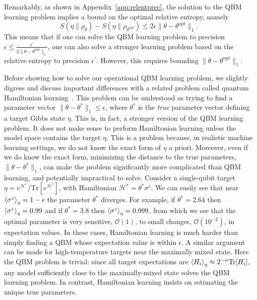 \documentclass[
    aps,
    prx,
    floatfix,
    nofootinbib,
    onecolumn
]{revtex4-2}
\newcommand{\Tr}{\mathrm{Tr}}
\begin{document}
Remarkably, as shown in Appendix~\ref{app:relentprec}, the solution to the QBM learning problem implies a bound on the optimal relative entropy, namely 
\begin{equation}
\label{eq:relentropbound}
S(\eta\|\rho_{\theta}) -  S(\eta\|\rho_{\theta^{\mathrm{opt}}}) \leq 2 \epsilon \| \theta - \theta^\textrm{opt} \|_1 .
\end{equation} 
This means that if one can solve the QBM learning problem to precision $\epsilon \leq \frac{\epsilon^\prime}{2\| \theta - \theta^\textrm{opt} \|_1}$, one can also solve a stronger learning problem based on the relative entropy to precision $\epsilon^\prime$. However, this requires bounding $\| \theta - \theta^\textrm{opt} \|_1$.

Before showing how to solve our operational QBM learning problem, we slightly digress and discuss important differences with a related problem called quantum Hamiltonian learning~\cite{Wiebe_2014, Anshu_2021, Haah_2022, Rouze_2023, Onorati_2023}. This problem can be understood as trying to find a parameter vector $\|\theta-\theta^*\|_1 \leq \epsilon$, where $\theta^*$ is the \emph{true} parameter vector defining a target Gibbs state $\eta$. This is, in fact, a stronger version of the QBM learning problem. It does not make sense to perform Hamiltonian learning unless the model space contains the target $\eta$. This is a problem because, in realistic machine learning settings, we do not know the exact form of $\eta$ a priori. Moreover, even if we do know the exact form, minimizing the distance to the true parameters, $\|\theta-\theta^*\|_1$, can make the problem significantly more complicated than QBM learning, and potentially impractical to solve. Consider a single-qubit target $\eta = e^{\mathcal{H}^*} / \Tr[e^{\mathcal{H}^*}]$, with Hamiltonian $\mathcal{H}^*=\theta^* \sigma^z$. We can easily see that near $\expval{\sigma^z}_\eta=1-\epsilon$ the parameter $\theta^*$ diverges. For example, if $\theta^*=2.64$ then $\expval{\sigma^z}_\eta=0.99$ and if $\theta^*=3.8$ then $\expval{\sigma^z}_\eta=0.999$, from which we see that the optimal parameter is very sensitive, $\mathcal{O}(1)$, to small changes, $\mathcal{O}(10^{-2})$, in expectation values. In these cases, Hamiltonian learning is much harder than simply finding a QBM whose expectation value is within $\epsilon$. A similar argument can be made for high-temperature targets near the maximally mixed state. Here the QBM problem is trivial: since all target expectations are $\expval{H_i}_\eta \approx 2^{-n} \Tr[H_i]$, any model sufficiently close to the maximally-mixed state solves the QBM learning problem. In contrast, Hamiltonian learning insists on estimating the unique true parameters.
\end{document}

